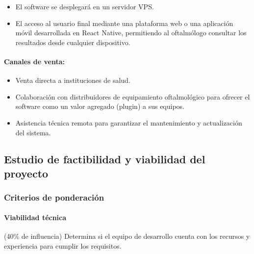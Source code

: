             \begin{itemize}
                \item El software se desplegará en un servidor VPS.
                
                \item El acceso al usuario final mediante una plataforma web o una aplicación móvil desarrollada en React Native, permitiendo al oftalmólogo consultar los resultados desde cualquier dispositivo.
            \end{itemize}

            \vspace{-0.5 cm}
            \paragraph{Canales de venta:}
            
            \begin{itemize}
                \item Venta directa a instituciones de salud.  
                
                \item Colaboración con distribuidores de equipamiento oftalmológico para ofrecer el software como un valor agregado (plugin) a sus equipos.  
                
                \item Asistencia técnica remota para garantizar el mantenimiento y actualización del sistema.
            \end{itemize}

        \subsection{Estudio de factibilidad y viabilidad del proyecto}
        
            \subsubsection*{Criterios de ponderación}
        
            \paragraph{Viabilidad técnica} (40\% de influencia) Determina si el equipo de desarrollo cuenta con los recursos y experiencia para cumplir los requisitos.
        
